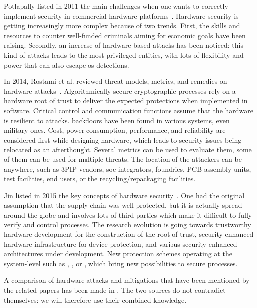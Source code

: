 Potlapally listed in 2011 the main challenges when one wants to correctly implement security in commercial hardware platforms~\cite{potlapally_hardware_2011}. Hardware security is getting increasingly more complex because of two trends. First, the skills and resources to counter well-funded criminals aiming for economic goals have been raising. Secondly, an increase of hardware-based attacks has been noticed: this kind of attacks leads to the most privileged entities, with lots of flexibility and power that can also escape \gls{os} detections. %

In 2014, Rostami et al. reviewed threat models, metrics, and remedies on hardware attacks~\cite{rostami_primer_2014}. Algorithmically secure cryptographic processes rely on a hardware root of trust to deliver the expected protections when implemented in software. Critical control and communication functions assume that the hardware is resilient to attacks. \Glspl{backdoor} have been found in various systems, even military ones. Cost, power consumption, performance, and reliability are considered first while designing hardware, which leads to security issues being relocated as an afterthought. Several metrics can be used to evaluate them, some of them can be used for multiple threats. The location of the attackers can be anywhere, such as 3PIP vendors, \gls{soc} integrators, foundries, PCB assembly units, test facilities, end users, or the recycling/repackaging facilities. %

Jin listed in 2015 the key concepts of hardware security~\cite{jin_introduction_2015}. One had the original assumption that the supply chain was well-protected, but it is actually spread around the globe and involves lots of third parties which make it difficult to fully verify and control processes. The research evolution is going towards trustworthy hardware development for the construction of the root of trust, security-enhanced hardware infrastructure for device protection, and various security-enhanced architectures under development. New protection schemes operating at the system-level such as , ,  or , which bring new possibilities to secure processes. %

A comparison of hardware attacks and mitigations that have been mentioned by the related papers has been made in . The two sources do not contradict themselves: we will therefore use their combined knowledge.

